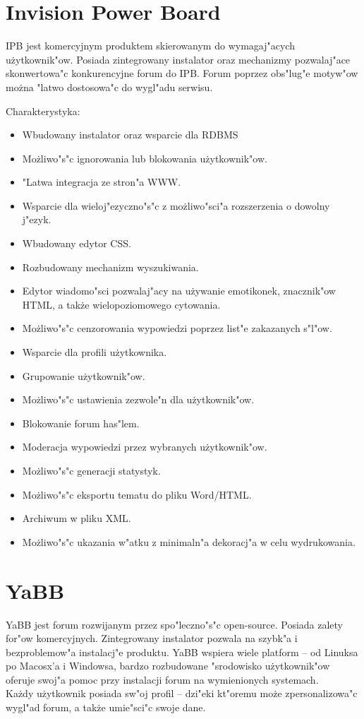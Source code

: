 \documentclass[12pt,a4paper,twoside]{article}
\begin{document}
\newpage	    
\section{Invision Power Board}
IPB jest komercyjnym produktem skierowanym do wymagaj"acych u\.zytkownik"ow. Posiada zintegrowany instalator oraz mechanizmy pozwalaj"ace skonwertowa"c konkurencyjne forum do IPB. Forum poprzez obs"lug"e motyw"ow mo\.zna "latwo dostosowa"c do wygl"adu serwisu.
	    
Charakterystyka:
\begin{itemize}	    
\item	    Wbudowany instalator oraz wsparcie dla RDBMS
\item	    Mo\.zliwo"s"c ignorowania lub blokowania u\.zytkownik"ow.
\item	    "Latwa integracja ze stron"a WWW.
\item	    Wsparcie dla wieloj"ezyczno"s"c z mo\.zliwo"sci"a rozszerzenia o dowolny j"ezyk.
\item	    Wbudowany edytor CSS.
\item	    Rozbudowany mechanizm wyszukiwania.
\item	    Edytor wiadomo"sci pozwalaj"acy na u\.zywanie emotikonek, znacznik"ow HTML, a tak\.ze wielopoziomowego cytowania.
\item	    Mo\.zliwo"s"c cenzorowania wypowiedzi poprzez list"e zakazanych s"l"ow.
\item	    Wsparcie dla profili u\.zytkownika.
\item	    Grupowanie u\.zytkownik"ow.
\item	    Mo\.zliwo"s"c ustawienia zezwole"n dla u\.zytkownik"ow.
\item	    Blokowanie forum has"lem.
\item	    Moderacja wypowiedzi przez wybranych u\.zytkownik"ow.
\item	    Mo\.zliwo"s"c generacji statystyk.
\item	    Mo\.zliwo"s"c eksportu tematu do pliku Word/HTML.
\item	    Archiwum w pliku XML.
\item	    Mo\.zliwo"s"c ukazania w"atku z minimaln"a dekoracj"a w celu wydrukowania.
\end{itemize}	    

\newpage
\section{YaBB}
YaBB jest forum rozwijanym przez spo"leczno"s"c open-source. Posiada zalety for"ow komercyjnych. Zintegrowany instalator pozwala na szybk"a i bezproblemow"a instalacj"e produktu. YaBB wspiera wiele platform -- od Linuksa po Macosx'a i Windowsa, bardzo rozbudowane "srodowisko u\.zytkownik"ow oferuje swoj"a pomoc przy instalacji forum na wymienionych systemach.\\
Ka\.zdy u\.zytkownik posiada sw"oj profil -- dzi"eki kt"oremu mo\.ze zpersonalizowa"c wygl"ad forum, a tak\.ze umie"sci"c swoje dane. 
		
\end{document}
